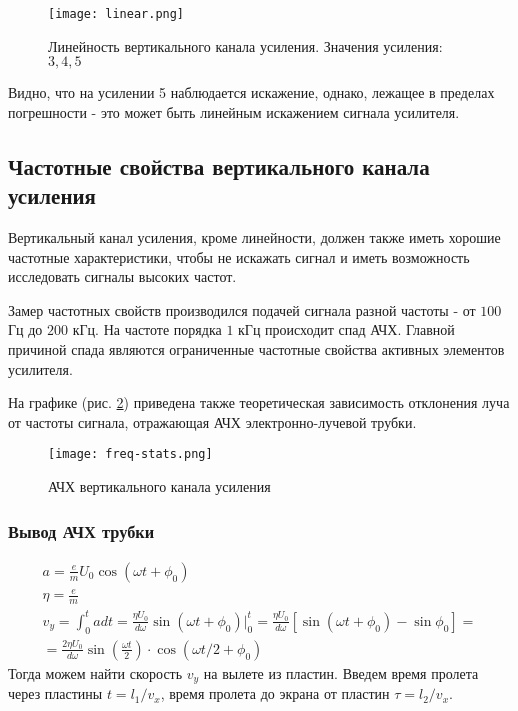 \begin{figure}[H]
	\centering
	\texttt{[image: linear.png]}
	\caption{Линейность вертикального канала усиления. Значения усиления: $3,4,5$}
	\label{fig:linear}
\end{figure}

Видно, что на усилении 5 наблюдается искажение, однако, лежащее в пределах погрешности - это может быть линейным искажением сигнала усилителя.

\label{ss:freq}\subsection{Частотные свойства вертикального канала усиления}

Вертикальный канал усиления, кроме линейности, должен также иметь хорошие частотные характеристики, чтобы не искажать сигнал и иметь возможность исследовать сигналы высоких частот. 

Замер частотных свойств производился подачей сигнала разной частоты - от $100$ Гц до $200$ кГц. На частоте порядка $1$ кГц происходит спад АЧХ. Главной причиной спада являются ограниченные частотные свойства активных элементов усилителя.

На графике (рис. \ref{fig:freq-stats}) приведена также теоретическая зависимость отклонения луча от частоты сигнала, отражающая АЧХ электронно-лучевой трубки.

\begin{figure}[H]
	\centering
	\texttt{[image: freq-stats.png]}
	\caption{АЧХ вертикального канала усиления}
	\label{fig:freq-stats}
\end{figure}

\subsubsection{Вывод АЧХ трубки}

\begin{gather}
	a=\frac{e}{m}U_0\cos(\omega{t}+\phi_0)\\
	\eta=\frac{e}{m}\\
	v_y=\int_0^t adt=\frac{\eta{U_0}}{d\omega}\sin(\omega{t}+\phi_0)\bigg|_0^t=\frac{\eta{U_0}}{d\omega}\left[\sin(\omega{t}+\phi_0)-\sin\phi_0\right]=\\
	\label{eq:cos}=\frac{2\eta{U_0}}{d\omega}\sin(\frac{\omega{t}}{2})\cdot\cos(\omega{t}/2+\phi_0)
\end{gather}
Тогда можем найти скорость $v_y$ на вылете из пластин. Введем время пролета через пластины $t=l_1/v_x$, время пролета до экрана от пластин $\tau=l_2/v_x$.

